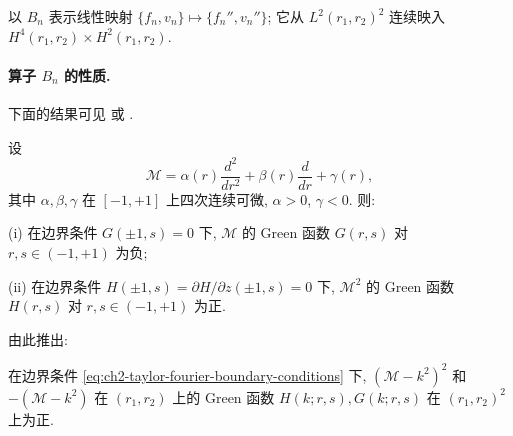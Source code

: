 \hypertarget{chapter-02-page-174}{}
以 $B_n$ 表示线性映射 $\{f_n,v_n\}\mapsto\{f_n'',v_n''\}$; 它从 $L^2(r_1,r_2)^2$ 连续映入 $H^4(r_1,r_2)\times H^2(r_1,r_2)$.

\paragraph{算子 $B_n$ 的性质.}
下面的结果可见  或 .

\begin{Lemma}
\label{lem:ch2-taylor-green-function-signs}
设
\[
\mathcal M=\alpha(r)\frac{d^2}{dr^2}
+\beta(r)\frac d{dr}+\gamma(r),
\]
其中 $\alpha,\beta,\gamma$ 在 $[-1,+1]$ 上四次连续可微, $\alpha>0$, $\gamma<0$. 则:

(i) 在边界条件 $G(\pm1,s)=0$ 下, $\mathcal M$ 的 Green 函数 $G(r,s)$ 对 $r,s\in(-1,+1)$ 为负;

(ii) 在边界条件 $H(\pm1,s)=\partial H/\partial z(\pm1,s)=0$ 下, $\mathcal M^2$ 的 Green 函数 $H(r,s)$ 对 $r,s\in(-1,+1)$ 为正.
\end{Lemma}

由此推出:

\begin{Lemma}
\label{lem:ch2-taylor-shifted-green-positive}
在边界条件 \eqref{eq:ch2-taylor-fourier-boundary-conditions} 下, $(\mathcal M-k^2)^2$ 和 $-(\mathcal M-k^2)$ 在 $(r_1,r_2)$ 上的 Green 函数 $H(k;r,s),G(k;r,s)$ 在 $(r_1,r_2)^2$ 上为正.
\end{Lemma}

